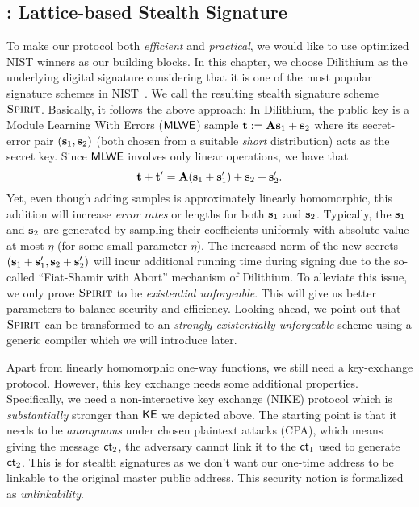 \subsection{\name: Lattice-based Stealth Signature}
To make our protocol both \emph{efficient} and \emph{practical}, we would like to use optimized NIST winners as our building blocks. In this chapter, we choose Dilithium as the underlying digital signature considering that it is one of the most popular signature schemes in NIST~\cite{NISTPQC-R3:CRYSTALS-DILITHIUM20}. We call the resulting stealth signature scheme $\textsc{Spirit}$. Basically, it follows the above approach: In Dilithium, the public key is a Module Learning With Errors ($\mathsf{MLWE}$) \cite{ITCS:BraGenVai12} sample $\mathbf{t}:=\mathbf{A}\mathbf{s}_1+\mathbf{s}_2$ where its secret-error pair $(\mathbf{s}_1,\mathbf{s}_2)$ (both chosen from a suitable \emph{short} distribution) acts as the secret key. Since $\mathsf{MLWE}$ involves only linear operations, we have that $$\mathbf{t}+\mathbf{t}'=\mathbf{A}(\mathbf{s}_1+\mathbf{s}'_1)+\mathbf{s}_2+\mathbf{s}_2'.$$
Yet, even though adding samples is approximately linearly homomorphic, this addition will increase \emph{error rates} or lengths for both $\mathbf{s}_1$ and $\mathbf{s}_2$. Typically, the $\mathbf{s}_1$ and $\mathbf{s}_2$ are generated by sampling their coefficients uniformly with absolute value at most $\eta$ (for some small parameter $\eta$). The increased norm of the new secrets $(\mathbf{s}_1+\mathbf{s}_1',\mathbf{s}_2+\mathbf{s}_2')$ will incur additional running time during signing due to the so-called ``Fiat-Shamir with Abort'' mechanism of Dilithium. To alleviate this issue, we only prove $\textsc{Spirit}$ to be \emph{existential unforgeable}. This will give us better parameters to balance security and efficiency. Looking ahead, we point out that $\textsc{Spirit}$ can be transformed to an \emph{strongly existentially unforgeable} scheme using a generic compiler which we will introduce later.

Apart from linearly homomorphic one-way functions, we still need a key-exchange protocol. However, this key exchange needs some additional properties. Specifically, we need a non-interactive key exchange (NIKE) protocol which is \emph{substantially} stronger than $\mathsf{KE}$ we depicted above.
The starting point is that it needs to be \emph{anonymous} under chosen plaintext attacks (CPA), which means giving the message $\mathsf{ct}_2$, the adversary cannot link it to the $\mathsf{ct}_1$ used to generate $\mathsf{ct}_2$. This is for stealth signatures as we don't want our one-time address to be linkable to the original master public address. This security notion is formalized as \emph{unlinkability}.

